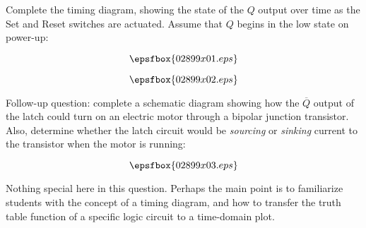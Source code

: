

Complete the timing diagram, showing the state of the $Q$ output over time as the Set and Reset switches are actuated.  Assume that $Q$ begins in the low state on power-up:

$$\epsfbox{02899x01.eps}$$







$$\epsfbox{02899x02.eps}$$

\vskip 10pt

Follow-up question: complete a schematic diagram showing how the $\overline{Q}$ output of the latch could turn on an electric motor through a bipolar junction transistor.  Also, determine whether the latch circuit would be {\it sourcing} or {\it sinking} current to the transistor when the motor is running:

$$\epsfbox{02899x03.eps}$$







Nothing special here in this question.  Perhaps the main point is to familiarize students with the concept of a timing diagram, and how to transfer the truth table function of a specific logic circuit to a time-domain plot.




